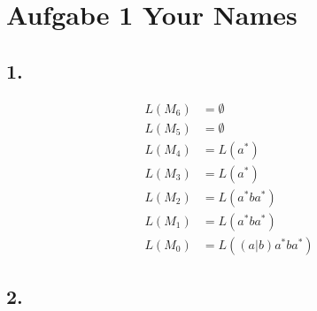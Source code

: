 \documentclass[a4paper, 11pt]{article}
\begin{document}
\section*{Aufgabe 1 \hspace{0.5em} \normalfont Your Names}


\subsection*{1.}

\begin{align*}
    L(M_6) &= \emptyset \\
    L(M_5) &= \emptyset \\
    L(M_4) &= L(a^*) \\
    L(M_3) &= L(a^*) \\
    L(M_2) &= L(a^*ba^*) \\
    L(M_1) &= L(a^*ba^*) \\
    L(M_0) &= L((a|b)a^*ba^*)
\end{align*}


\subsection*{2.}
\end{document}

